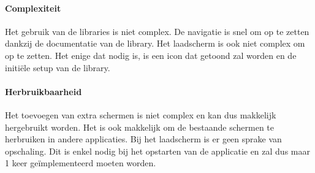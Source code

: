 \paragraph{Complexiteit}
Het gebruik van de libraries is niet complex. De navigatie is snel om op te zetten dankzij de documentatie van de library.
Het laadscherm is ook niet complex om op te zetten. Het enige dat nodig is, is een icon dat getoond zal worden en de 
initiële setup van de library. 

\paragraph{Herbruikbaarheid}
Het toevoegen van extra schermen is niet complex en kan dus makkelijk hergebruikt worden. Het is ook makkelijk om de
bestaande schermen te herbruiken in andere applicaties. Bij het laadscherm is er geen sprake van opschaling. Dit is enkel
nodig bij het opstarten van de applicatie en zal dus maar 1 keer geïmplementeerd moeten worden.

